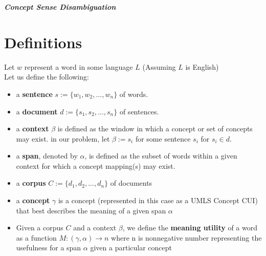 \documentclass[12pt, letterpaper]{article}
\begin{document}
\begin{center}
\textit{\textbf{Concept Sense Disambiguation}}
\end{center}

\section{Definitions}
Let $w$ represent a word in some language $L$ (Assuming $L$ is English)\\
Let us define the following:\\
\begin{itemize}
\item{a \textbf{sentence} $s := \{w_1,w_2,...,w_n\}$} of words.
\item{a \textbf{document} $d := \{s_1,s_2,...,s_n\}$} of sentences.
\item{a \textbf{context} $\beta$ is defined as the window in which a concept or set of concepts may exist. in our problem, let $\beta := s_i$ for some sentence $s_i$ for $s_i \in d$.}
\item{a \textbf{span}, denoted by $\alpha$, is defined as the subset of words within a given context for which a concept mapping(s) may exist.}
\item{a \textbf{corpus} $C := \{d_1,d_2,...,d_n\}$ of documents}
\item{a \textbf{concept} $\gamma$ is a concept (represented in this case as a UMLS Concept CUI) that best describes the meaning of a given span $\alpha$}
\item{Given a corpus $C$ and a context $\beta$, we define the \textbf{meaning utility} of a word as a function $M: (\gamma,\alpha) \rightarrow n$ where n is nonnegative number representing the usefulness for a span $\alpha$ given a particular concept}
\end{itemize}
\end{document}

